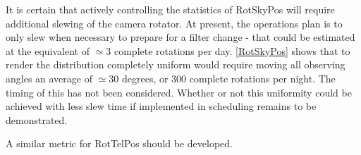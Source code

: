 It is certain that actively controlling the statistics of RotSkyPos
will require additional slewing of the camera rotator.  At present,
the operations plan is to only slew when necessary to prepare for a
filter change - that could be estimated at the equivalent of $\simeq
3$ complete rotations per day.  \autoref{RotSkyPos} shows that to
render the distribution completely uniform would require moving all
observing angles an average of $\simeq 30$ degrees, or 300 complete
rotations per night.  The timing of this has not been considered.
Whether or not this uniformity could be achieved with less slew time
if implemented in scheduling remains to be demonstrated.

A similar metric for RotTelPos should be developed.
